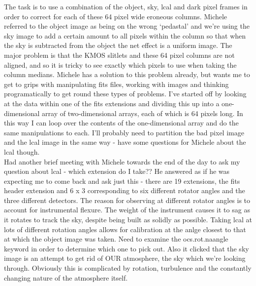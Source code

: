 \documentclass{literature}
\begin{document}
The task is to use a combination of the object, sky, lcal and dark pixel frames in order to correct for each of these 64 pixel wide eroneous columns. Michele referred to the object image as being on the wrong `pedastal' and we're using the sky image to add a certain amount to all pixels within the column so that when the sky is subtracted from the object the net effect is a uniform image. The major problem is that the KMOS slitlets and these 64 pixel columns are not aligned, and so it is tricky to see exactly which pixels to use when taking the column medians. Michele has a solution to this problem already, but wants me to get to grips with manipulating fits files, working with images and thinking programatically to get round these types of problems. I've started off by looking at the data within one of the fits extensions and dividing this up into a one-dimensional array of two-dimensional arrays, each of which is 64 pixels long. In this way I can loop over the contents of the one-dimensional array and do the same manipulations to each. I'll probably need to partition the bad pixel image and the lcal image in the same way - have some questions for Michele about the lcal though. \\ 
Had another brief meeting with Michele towards the end of the day to ask my question about lcal - which extension do I take?? He answered as if he was expecting me to come back and ask just this - there are 19 extensions, the fits header extension and 6 x 3 corresponding to six different rotator angles and the three different detectors. The reason for observing at different rotator angles is to account for instrumental flexure. The weight of the instrument causes it to sag as it rotates to track the sky, despite being built as solidly as possible. Taking lcal at lots of different rotation angles allows for calibration at the anlge closest to that at which the object image was taken. Need to examine the ocs.rot.naangle keyword in order to determine which one to pick out. Also it clicked that the sky image is an attempt to get rid of OUR atmosphere, the sky which we're looking through. Obviously this is complicated by rotation, turbulence and the constantly changing nature of the atmosphere itself. 
\end{document}
